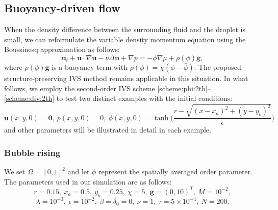 \subsection{Buoyancy-driven flow} 
When the density difference between the surrounding fluid and the droplet is small,  we can reformulate the variable density momentum equation using the Boussinesq approximation \cite{lee2012comparison} as follows:
\[
\bm u_t+\bm u \cdot \nabla \bm u -\nu \Delta \bm u+\nabla p =- \phi \nabla \mu + \rho(\phi)\bm g,
\]    
where $\rho(\phi) \bm g$ is a buoyancy term with $\rho(\phi)=\chi(\phi - \bar{\phi})$. 
The proposed structure-preserving IVS method remains applicable in this situation. In what follows, we employ the second-order IVS scheme \eqref{scheme:phi:2th}--\eqref{scheme:div:2th} to test two distinct examples with the initial conditions:
\[
\bm u(x, y,0)=\mathbf{0}, ~ p(x, y, 0)={0}, ~ \phi(x,y,0) = \tanh \big(\frac{r-\sqrt{(x-x_a)^2+(y-y_b)^2}}{\epsilon} \big) 
\]
and other parameters will be illustrated in detail in each example.

\subsubsection{Bubble rising} 
We set $\Omega=[0,1]^2$ and let $\bar{\phi}$ represent the spatially averaged order parameter. The parameters used in our simulation are as follows:
\[
r =0.15, ~ x_a = 0.5, ~ y_b = 0.25, ~ \chi = 5, ~ \bm g =(0, 10)^{T}, ~ M=10^{-2},  \]
\[ 
\lambda=10^{-3}, ~ \epsilon =10^{-2}, ~ \beta = \delta_0 = 0, ~ \nu =1, ~\tau=5 \times 10^{-4}, ~ N=200. 
\]

